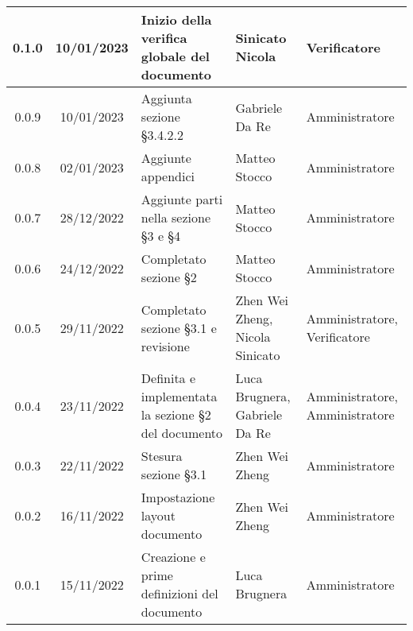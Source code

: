 \begin{center}
\begin{tabularx}{\textwidth}{| c | c | X | X | X |}
 \hline
 0.1.0 & 10/01/2023 & Inizio della verifica globale del documento & Sinicato Nicola & Verificatore\\
 \hline
 0.0.9 & 10/01/2023 & Aggiunta sezione §3.4.2.2 & Gabriele Da Re & Amministratore\\
 \hline
 0.0.8 & 02/01/2023 & Aggiunte appendici & Matteo Stocco & Amministratore\\
 \hline
 0.0.7 & 28/12/2022 & Aggiunte parti nella sezione §3 e §4 & Matteo Stocco & Amministratore\\
 \hline
 0.0.6 & 24/12/2022 & Completato sezione §2 & Matteo Stocco & Amministratore\\
 \hline
 0.0.5 & 29/11/2022 & Completato sezione §3.1 e revisione & Zhen Wei Zheng, Nicola Sinicato & Amministratore, Verificatore\\
 \hline
 0.0.4 & 23/11/2022 &  Definita e implementata la sezione §2 del documento & Luca Brugnera, Gabriele Da Re & Amministratore, Amministratore\\
 \hline
 0.0.3 & 22/11/2022 & Stesura sezione §3.1 & Zhen Wei Zheng & Amministratore\\
 \hline
 0.0.2 & 16/11/2022 & Impostazione layout documento & Zhen Wei Zheng & Amministratore\\
 \hline
 0.0.1 & 15/11/2022 & Creazione e prime definizioni del documento & Luca Brugnera & Amministratore\\
 \hline
\end{tabularx}
\end{center}
